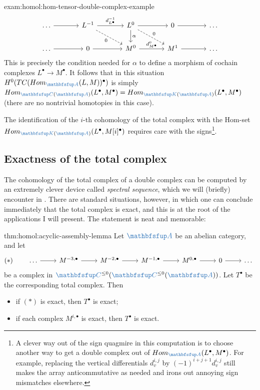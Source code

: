 \begin{exam}{}{exam:homol:hom-tensor-double-complex-example}
\[\begin{tikzcd}[column sep=large]
      \dots \arrow[r] & L^{-1} \arrow[r, "d_{L^\bullet}^{-1}"] & L^0
      \arrow[r] \arrow[d, "\alpha"] \arrow[from=1-2, to=2-3, dashed,
      "0"'] \arrow[from=1-3, to=2-4,
      dashed, "0"] & 0 \arrow[r] & \dots \\
      \dots \arrow[r] & 0 \arrow[r] & M^0 \arrow[r, "d_{M^\bullet}^0"]
      & M^1 \arrow[r] & \dots
    \end{tikzcd}\] This is precisely the condition needed for $\alpha$
  to define a morphism of cochain complexes $L^\bullet \to
  M^\bullet$. It follows that in this situation
  $H^0(TC(\Hom_{\categ{A}}(L, M))^\bullet)$ is simply
  $\Hom_{\categ{C}(\categ{A})}(L^\bullet, M^\bullet) =
  \Hom_{\categ{K}(\categ{A})}(L^\bullet, M^\bullet)$ (there are no
  nontrivial homotopies in this case).

  The identification of the $i$-th cohomology of the total complex
  with the Hom-set
  $\Hom_{\categ{K}(\categ{A})}(L^\bullet, M[i]^\bullet)$ requires care
  with the signs\footnote{A clever way out of the sign quagmire in
    this computation is to choose another way to get a double complex
    out of $\Hom_{\categ{A}}(L^\bullet, M^\bullet)$. For example,
    replacing the vertical differentials $d_v^{i,j}$ by
    $(-1)^{i+j+1}d_v^{i,j}$ still makes the array anticommutative as
    needed and irons out annoying sign mismatches elsewhere.}.
\end{exam}

\subsection{Exactness of the total complex}
\label{subsec:homol:exactness-of-the-total-complex}

The cohomology of the total complex of a double complex can be
computed by an extremely clever device called \emph{spectral
  sequence}, which we will (briefly) encounter in
. There are standard
situations, however, in which one can conclude immediately that the
total complex is exact, and this is at the root of the applications I
will present. The statement is neat and memorable:

\begin{thm}{}{thm:homol:acyclic-assembly-lemma}
  Let $\categ{A}$ be an abelian category, and let
  \[
    (*) \qquad
    \begin{tikzcd}
      \dots \arrow[r] & M^{-3,\bullet} \arrow[r] & M^{-2,\bullet}
      \arrow[r] & M^{-1,\bullet} \arrow[r] & M^{0,\bullet} \arrow[r] &
      0 \arrow[r] & \dots
    \end{tikzcd}
  \]
  be a complex in $\categ{C}^{\le 0}(\categ{C}^{\le 0}(\categ{A}))$.
  Let $T^\bullet$ be the corresponding total complex. Then
  \begin{itemize}
  \item if $(*)$ is exact, then $T^\bullet$ is exact;
  \item if each complex $M^{i,\bullet}$ is exact, then $T^\bullet$ is
    exact.
  \end{itemize}
\end{thm}

